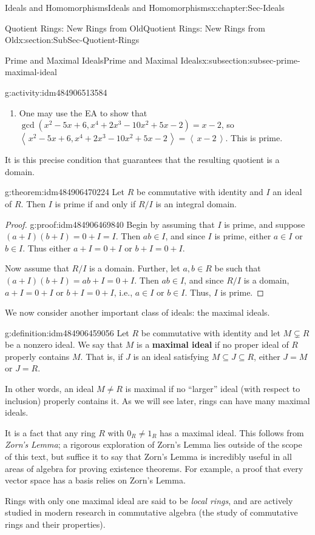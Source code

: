 \documentclass[oneside,10pt,]{book}
\newcommand{\terminology}[1]{\textbf{#1}}
\numberwithin{equation}{section}
\newcommand{\ideal}[1]{\left\langle\, #1 \,\right\rangle}
\begin{document}
\begin{chapterptx}{Ideals and Homomorphisms}{}{Ideals and Homomorphisms}{}{}{x:chapter:Sec-Ideals}
\begin{sectionptx}{Quotient Rings: New Rings from Old}{}{Quotient Rings: New Rings from Old}{}{}{x:section:SubSec-Quotient-Rings}
\begin{subsectionptx}{Prime and Maximal Ideals}{}{Prime and Maximal Ideals}{}{}{x:subsection:subsec-prime-maximal-ideal}
\begin{activity}{}{g:activity:idm484906513584}
\begin{enumerate}
\item{}One may use the EA to show that \(\gcd(x^2-5x+6,x^4+2x^3-10x^2+5x-2) = x-2\), so \(\ideal{x^2-5x+6, x^4+2x^3-10x^2+5x-2} = \ideal{x-2}\). This is prime.%
\end{enumerate}
%
\end{activity}
It is this precise condition that guarantees that the resulting quotient is a domain.%
\begin{theorem}{}{}{g:theorem:idm484906470224}%
Let \(R\) be commutative with identity and \(I\) an ideal of \(R\). Then \(I\) is prime if and only if \(R/I\) is an integral domain.%
\end{theorem}
\begin{proof}{}{g:proof:idm484906469840}
Begin by assuming that \(I\) is prime, and suppose \((a+I)(b+I) = 0+I = I\). Then \(ab \in I\), and since \(I\) is prime, either \(a\in I\) or \(b\in I\). Thus either \(a+I = 0+I\) or \(b+I = 0+I\).%
\par
Now assume that \(R/I\) is a domain. Further, let \(a,b\in R\) be such that \((a+I)(b+I) = ab+I = 0+I\). Then \(ab\in I\), and since \(R/I\) is a domain, \(a+I = 0+I\) or \(b+I = 0+I\), i.e., \(a\in I\) or \(b\in I\). Thus, \(I\) is prime.%
\end{proof}
We now consider another important class of ideals: the maximal ideals.%
\begin{definition}{}{g:definition:idm484906459056}%
%
%
Let \(R\) be commutative with identity and let \(M\subsetneq R\) be a nonzero ideal. We say that \(M\) is a \terminology{maximal ideal} if no proper ideal of \(R\) properly contains \(M\). That is, if \(J\) is an ideal satisfying \(M\subseteq J\subseteq R\), either \(J=M\) or \(J=R\).%
\end{definition}
In other words, an ideal \(M\ne R\) is maximal if no ``larger'' ideal (with respect to inclusion) properly contains it. As we will see later, rings can have many maximal ideals.%
\par
It is a fact that any ring \(R\) with \(0_R\ne 1_R\) has a maximal ideal. This follows from \emph{Zorn's Lemma}; a rigorous exploration of Zorn's Lemma lies outside of the scope of this text, but suffice it to say that Zorn's Lemma is incredibly useful in all areas of algebra for proving existence theorems. For example, a proof that every vector space has a basis relies on Zorn's Lemma.%
\par
Rings with only one maximal ideal are said to be \emph{local rings}, and are actively studied in modern research in commutative algebra (the study of commutative rings and their properties).%

\end{subsectionptx}
\end{sectionptx}
\end{chapterptx}
\end{document}
